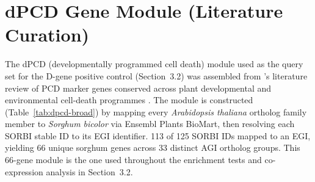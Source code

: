 
\clearpage
\section{dPCD Gene Module (Literature Curation)}
\hspace{1em}The dPCD (developmentally programmed cell death) module used as the query set for the D-gene positive control (Section~3.2) was assembled from \citeauthor{olvera-carrilloConservedCorePCD2015}'s literature review of PCD marker genes conserved across plant developmental and environmental cell-death programmes \cite{olvera-carrilloConservedCorePCD2015}. The module is constructed (Table~\ref{tab:dpcd-broad}) by mapping every \textit{Arabidopsis thaliana} ortholog family member to \textit{Sorghum bicolor} via Ensembl Plants BioMart, then resolving each SORBI stable ID to its EGI identifier. 113 of 125 SORBI IDs mapped to an EGI, yielding 66 unique sorghum genes across 33 distinct AGI ortholog groups. This 66-gene module is the one used throughout the enrichment tests and co-expression analysis in Section~3.2.

